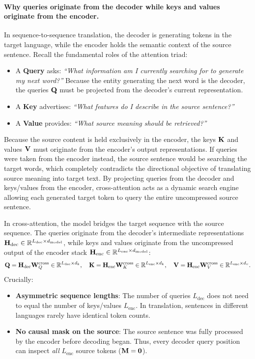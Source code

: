 \documentclass[../../main.tex]{subfiles}
\begin{document}
\paragraph{Why queries originate from the decoder while keys and values originate from the encoder.}
In sequence-to-sequence translation, the decoder is generating tokens in the target language, while the encoder holds the semantic context of the source sentence.
Recall the fundamental roles of the attention triad:
\begin{itemize}
    \item A \textbf{Query} asks: \emph{``What information am I currently searching for to generate my next word?''} Because the entity generating the next word is the decoder, the queries $\mathbf{Q}$ must be projected from the decoder's current representation.
    \item A \textbf{Key} advertises: \emph{``What features do I describe in the source sentence?''}
    \item A \textbf{Value} provides: \emph{``What source meaning should be retrieved?''}
\end{itemize}
Because the source content is held exclusively in the encoder, the keys $\mathbf{K}$ and values $\mathbf{V}$ must originate from the encoder's output representations. If queries were taken from the encoder instead, the source sentence would be searching the target words, which completely contradicts the directional objective of translating source meaning into target text. By projecting queries from the decoder and keys/values from the encoder, cross-attention acts as a dynamic search engine allowing each generated target token to query the entire uncompressed source sentence.

In cross-attention, the model bridges the target sequence with the source sequence.
The queries originate from the decoder's intermediate representations $\mathbf{H}_{\text{dec}} \in \mathbb{R}^{L_{\text{dec}} \times d_{\text{model}}}$, while keys and values originate from the uncompressed output of the encoder stack $\mathbf{H}_{\text{enc}} \in \mathbb{R}^{L_{\text{enc}} \times d_{\text{model}}}$:
\begin{equation}
\label{eq:cross_attention_projections_explicit}
\mathbf{Q} = \mathbf{H}_{\text{dec}} \mathbf{W}_Q^{\text{cross}} \in \mathbb{R}^{L_{\text{dec}} \times d_k}, \quad
\mathbf{K} = \mathbf{H}_{\text{enc}} \mathbf{W}_K^{\text{cross}} \in \mathbb{R}^{L_{\text{enc}} \times d_k}, \quad
\mathbf{V} = \mathbf{H}_{\text{enc}} \mathbf{W}_V^{\text{cross}} \in \mathbb{R}^{L_{\text{enc}} \times d_v}.
\end{equation}
Crucially:
\begin{itemize}
    \item \textbf{Asymmetric sequence lengths}: The number of queries $L_{\text{dec}}$ does not need to equal the number of keys/values $L_{\text{enc}}$. In translation, sentences in different languages rarely have identical token counts.
    \item \textbf{No causal mask on the source}: The source sentence was fully processed by the encoder before decoding began. Thus, every decoder query position can inspect \emph{all} $L_{\text{enc}}$ source tokens ($\mathbf{M} = \mathbf{0}$).
\end{itemize}
\end{document}
